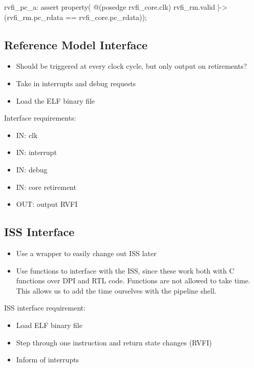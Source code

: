 \begin{systemverilog}[caption={Assertion comparing the PC of the \acrshort{rm}.}, label={lst:pc_assertion}]
rvfi_pc_a: assert property( @(posedge rvfi_core.clk)
    rvfi_rm.valid |-> (rvfi_rm.pc_rdata == rvfi_core.pc_rdata));
\end{systemverilog}

\subsection{Reference Model Interface}


\begin{itemize}
    \item Should be triggered at every clock cycle, but only output on retirements?
    \item Take in interrupts and debug requests
    \item Load the ELF binary file
\end{itemize}

\textbf{}

Interface requirements:

\begin{itemize}
    \item IN: clk
    \item IN: interrupt
    \item IN: debug
    \item IN: core retirement
    \item OUT: output RVFI
\end{itemize}


\subsection{ISS Interface}


\begin{itemize}
    \item Use a wrapper to easily change out ISS later
    \item Use functions to interface with the ISS, since these work both with C functions over DPI and RTL code. Functions are not allowed to take time. This allows us to add the time ourselves with the pipeline shell.
\end{itemize}

ISS interface requirement:

\begin{itemize}
    \item Load ELF binary file \textbf{}
    \item Step through one instruction and return state changes (RVFI)
    \item Inform of interrupts
    
\end{itemize}



